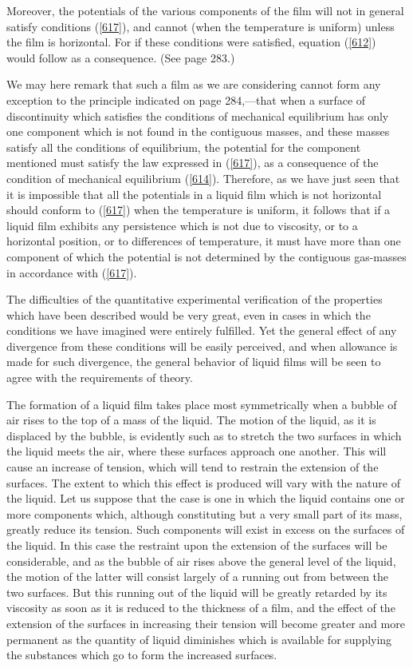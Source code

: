 \documentclass[12pt]{article}
\begin{document}
Moreover, the potentials of the various components of the film will not in general satisfy conditions (\ref{617}), and cannot (when the temperature is uniform) unless the film is horizontal. For if these conditions were satisfied, equation (\ref{612}) would follow as a consequence. (See page 283.)

We may here remark that such a film as we are considering cannot form any exception to the principle indicated on page 284,---that when a surface of discontinuity which satisfies the conditions of mechanical equilibrium has only one component which is not found in the contiguous masses, and these masses satisfy all the conditions of equilibrium, the potential for the component mentioned must satisfy the law expressed in (\ref{617}), as a consequence of the condition of mechanical equilibrium (\ref{614}). Therefore, as we have just seen that it is impossible that all the potentials in a liquid film which is not horizontal should conform to (\ref{617}) when the temperature is uniform, it follows that if a liquid film exhibits any persistence which is not due to viscosity, or to a horizontal position, or to differences of temperature, it must have more than one component of which the potential is not determined by the contiguous gas-masses in accordance with (\ref{617}).

The difficulties of the quantitative experimental verification of the properties which have been described would be very great, even in cases in which the conditions we have imagined were entirely fulfilled. Yet the general effect of any divergence from these conditions will be easily perceived, and when allowance is made for such divergence, the general behavior of liquid films will be seen to agree with the requirements of theory.

The formation of a liquid film takes place most symmetrically when a bubble of air rises to the top of a mass of the liquid. The motion of the liquid, as it is displaced by the bubble, is evidently such as to stretch the two surfaces in which the liquid meets the air, where these surfaces approach one another. This will cause an increase of tension, which will tend to restrain the extension of the surfaces. The extent to which this effect is produced will vary with the nature of the liquid. Let us suppose that the case is one in which the liquid contains one or more components which, although constituting but a very small part of its mass, greatly reduce its tension. Such components will exist in excess on the surfaces of the liquid. In this case the restraint upon the extension of the surfaces will be considerable, and as the bubble of air rises above the general level of the liquid, the motion of the latter will consist largely of a running out from between the two surfaces. But this running out of the liquid will be greatly retarded by its viscosity as soon as it is reduced to the thickness of a film, and the effect of the extension of the surfaces in increasing their tension will become greater and more permanent as the quantity of liquid diminishes which is available for supplying the substances which go to form the increased surfaces.
\end{document}
